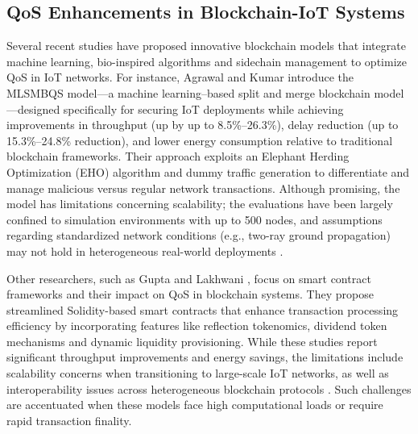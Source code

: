 \documentclass[12pt,onecolumn]{IEEEtran} %
\begin{document}
\subsection*{QoS Enhancements in Blockchain-IoT Systems}
Several recent studies have proposed innovative blockchain models that integrate machine learning, bio-inspired algorithms and sidechain management to optimize QoS in IoT networks. For instance, Agrawal and Kumar \cite{agrawal2022mlsmbqsdesignof} introduce the MLSMBQS model---a machine learning--based split and merge blockchain model---designed specifically for securing IoT deployments while achieving improvements in throughput (up by up to 8.5\%--26.3\%), delay reduction (up to 15.3\%--24.8\% reduction), and lower energy consumption relative to traditional blockchain frameworks. Their approach exploits an Elephant Herding Optimization (EHO) algorithm and dummy traffic generation to differentiate and manage malicious versus regular network transactions. Although promising, the model has limitations concerning scalability; the evaluations have been largely confined to simulation environments with up to 500 nodes, and assumptions regarding standardized network conditions (e.g., two-ray ground propagation) may not hold in heterogeneous real-world deployments \cite{agrawal2022mlsmbqsdesignof}.

Other researchers, such as Gupta and Lakhwani \cite{gupta2025enhancingblockchainqualityofservice}, focus on smart contract frameworks and their impact on QoS in blockchain systems. They propose streamlined Solidity-based smart contracts that enhance transaction processing efficiency by incorporating features like reflection tokenomics, dividend token mechanisms and dynamic liquidity provisioning. While these studies report significant throughput improvements and energy savings, the limitations include scalability concerns when transitioning to large-scale IoT networks, as well as interoperability issues across heterogeneous blockchain protocols \cite{gupta2025enhancingblockchainqualityofservice}. Such challenges are accentuated when these models face high computational loads or require rapid transaction finality.
\end{document}
